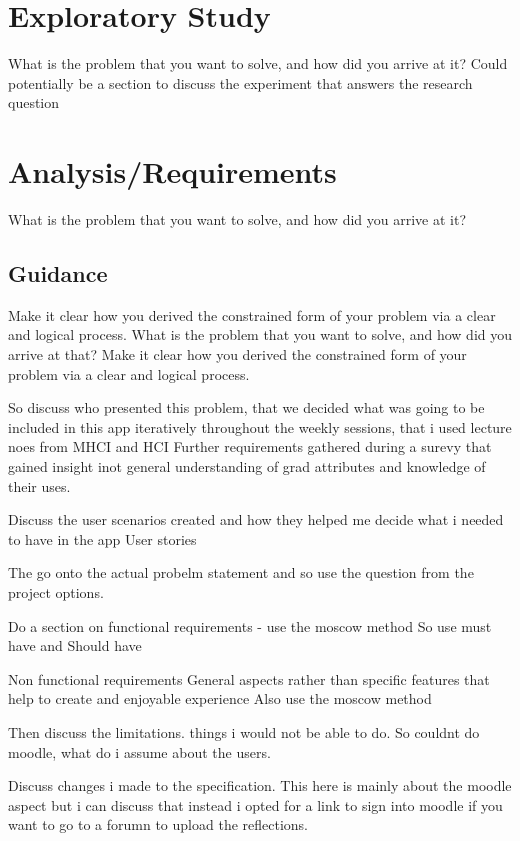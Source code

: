 \documentclass{l4proj}
\begin{document}
\chapter{Exploratory Study}
What is the problem that you want to solve, and how did you arrive at it?
Could potentially be a section to discuss the experiment that answers the research question 


\chapter{Analysis/Requirements}
What is the problem that you want to solve, and how did you arrive at it?
\section{Guidance}
Make it clear how you derived the constrained form of your problem via a clear and logical process.
What is the problem that you want to solve, and how did you arrive at that?
Make it clear how you derived the constrained form of your problem via a clear and logical process. 
\par
So discuss who presented this problem, that we decided what was going to be included in this app 
iteratively throughout the weekly sessions, that i used lecture noes from MHCI and HCI
Further requirements gathered during a surevy that gained insight inot general understanding of grad attributes
and knowledge of their uses.
\par 
Discuss the user scenarios created and how they helped me decide what i needed to have in the app
User stories
\par 
The go onto the actual probelm statement and so use the question from the project options.
\par 
Do a section on functional requirements - use the moscow method
So use must have and Should have
\par 
Non functional requirements
General aspects rather than specific features that help to create and enjoyable experience
Also use the moscow method
\par 
Then discuss the limitations. things i would not be able to do.
So couldnt do moodle, what do i assume about the users. 
\par 
Discuss changes i made to the specification. This here is mainly about the moodle aspect but i can discuss 
that instead i opted for a link to sign into moodle if you want to go to a forumn to upload the reflections. 
\end{document}
